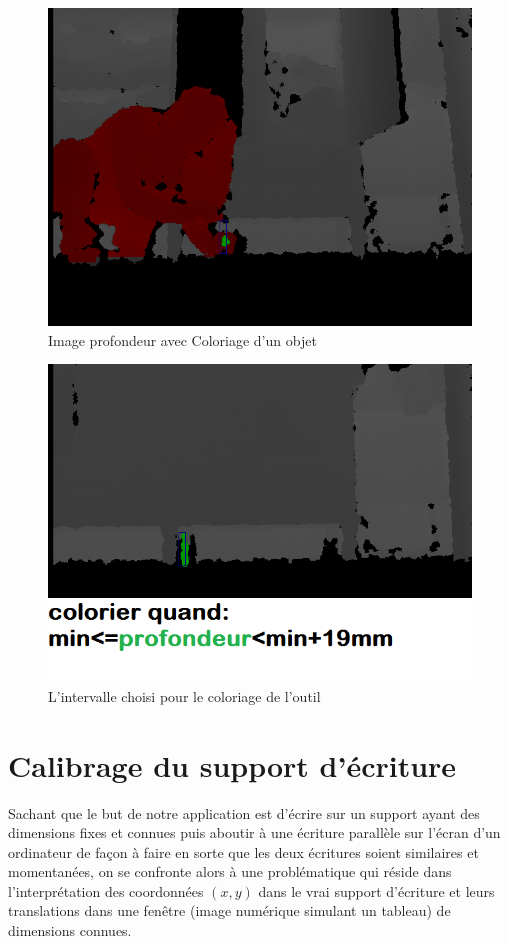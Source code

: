 \documentclass[12pt,a4paper,oneside]{book}
\begin{document}
	\begin{figure}[H]
		\centering
		\includegraphics[scale=0.5]{hassinapixelrouge3.png}
		\caption{Image profondeur avec Coloriage d'un objet}
		\label{fig1c}
	\end{figure}
	
	\begin{figure}[H]
		\centering
		\includegraphics[scale=0.5]{i5.png}
		\caption{L'intervalle choisi pour le coloriage de l'outil}
		\label{figd0}
	\end{figure}
	
	\section{Calibrage du support d'écriture}	
	Sachant que le but de notre  application est d'écrire sur un support ayant  des dimensions fixes et connues puis aboutir à une écriture  parallèle sur l'écran d'un ordinateur de façon à faire en sorte que les deux écritures soient similaires et momentanées, on se confronte alors à une problématique qui réside dans l'interprétation des coordonnées $(x,y)$ dans le vrai support d'écriture et leurs translations  dans une fenêtre (image numérique simulant un tableau)  de dimensions connues.
	
\end{document}
